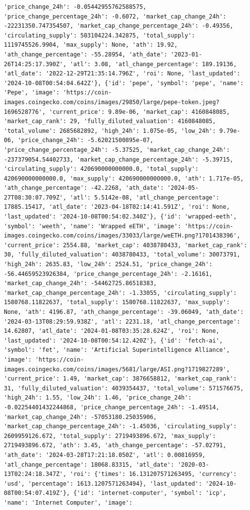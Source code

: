 \documentclass[
  letterpaper,
  DIV=11,
  numbers=noendperiod]{scrreprt}
\begin{document}
\begin{verbatim}
'price_change_24h': -0.05442955762588575, 'price_change_percentage_24h': -0.6072, 'market_cap_change_24h': -22231350.747354507, 'market_cap_change_percentage_24h': -0.49356, 'circulating_supply': 503104224.342875, 'total_supply': 1119745526.9904, 'max_supply': None, 'ath': 19.92, 'ath_change_percentage': -55.28954, 'ath_date': '2023-01-26T14:25:17.390Z', 'atl': 3.08, 'atl_change_percentage': 189.19136, 'atl_date': '2022-12-29T21:35:14.796Z', 'roi': None, 'last_updated': '2024-10-08T00:54:04.642Z'}, {'id': 'pepe', 'symbol': 'pepe', 'name': 'Pepe', 'image': 'https://coin-images.coingecko.com/coins/images/29850/large/pepe-token.jpeg?1696528776', 'current_price': 9.89e-06, 'market_cap': 4160848085, 'market_cap_rank': 29, 'fully_diluted_valuation': 4160848085, 'total_volume': 2685682892, 'high_24h': 1.075e-05, 'low_24h': 9.79e-06, 'price_change_24h': -5.62021500895e-07, 'price_change_percentage_24h': -5.37525, 'market_cap_change_24h': -237379054.54402733, 'market_cap_change_percentage_24h': -5.39715, 'circulating_supply': 420690000000000.0, 'total_supply': 420690000000000.0, 'max_supply': 420690000000000.0, 'ath': 1.717e-05, 'ath_change_percentage': -42.2268, 'ath_date': '2024-05-27T08:30:07.709Z', 'atl': 5.5142e-08, 'atl_change_percentage': 17885.15417, 'atl_date': '2023-04-18T02:14:41.591Z', 'roi': None, 'last_updated': '2024-10-08T00:54:02.340Z'}, {'id': 'wrapped-eeth', 'symbol': 'weeth', 'name': 'Wrapped eETH', 'image': 'https://coin-images.coingecko.com/coins/images/33033/large/weETH.png?1701438396', 'current_price': 2554.88, 'market_cap': 4038780433, 'market_cap_rank': 30, 'fully_diluted_valuation': 4038780433, 'total_volume': 30073791, 'high_24h': 2635.83, 'low_24h': 2524.51, 'price_change_24h': -56.44659523926384, 'price_change_percentage_24h': -2.16161, 'market_cap_change_24h': -54462725.86518383, 'market_cap_change_percentage_24h': -1.33055, 'circulating_supply': 1580768.11822637, 'total_supply': 1580768.11822637, 'max_supply': None, 'ath': 4196.87, 'ath_change_percentage': -39.06049, 'ath_date': '2024-03-13T08:29:59.938Z', 'atl': 2231.18, 'atl_change_percentage': 14.62807, 'atl_date': '2024-01-08T03:35:28.624Z', 'roi': None, 'last_updated': '2024-10-08T00:54:12.420Z'}, {'id': 'fetch-ai', 'symbol': 'fet', 'name': 'Artificial Superintelligence Alliance', 'image': 'https://coin-images.coingecko.com/coins/images/5681/large/ASI.png?1719827289', 'current_price': 1.49, 'market_cap': 3876658812, 'market_cap_rank': 31, 'fully_diluted_valuation': 4039354437, 'total_volume': 571576675, 'high_24h': 1.55, 'low_24h': 1.46, 'price_change_24h': -0.02254401432244868, 'price_change_percentage_24h': -1.49514, 'market_cap_change_24h': -57053180.25035906, 'market_cap_change_percentage_24h': -1.45036, 'circulating_supply': 2609959126.672, 'total_supply': 2719493896.672, 'max_supply': 2719493896.672, 'ath': 3.45, 'ath_change_percentage': -57.02791, 'ath_date': '2024-03-28T17:21:18.050Z', 'atl': 0.00816959, 'atl_change_percentage': 18068.83315, 'atl_date': '2020-03-13T02:24:18.347Z', 'roi': {'times': 16.131207571263495, 'currency': 'usd', 'percentage': 1613.1207571263494}, 'last_updated': '2024-10-08T00:54:07.419Z'}, {'id': 'internet-computer', 'symbol': 'icp', 'name': 'Internet Computer', 'image': 
\end{verbatim}
\end{document}
